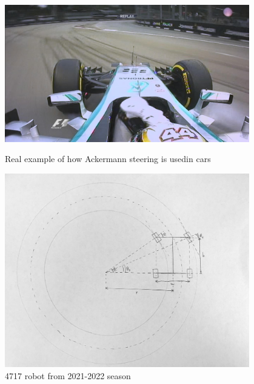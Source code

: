 \begin{figure}[ht]
\centering
\begin{minipage}[b]{.48\textwidth}
  \centering
  \includegraphics[width=0.95\textwidth]{Meetings/October/10-06-22/10-6-22_CAD_Figure1.jpg}
  \caption{Real example of how Ackermann steering is usedin cars}
  \label{fig:pic1}
\end{minipage}%
\hfill%
\begin{minipage}[b]{.48\textwidth}
  \centering
  \includegraphics[width=0.95\textwidth]{Meetings/October/10-06-22/10-6-22_CAD_Figure3.png}
  \caption{4717 robot from 2021-2022 season}
  \label{fig:pic2}
\end{minipage}
\end{figure}

